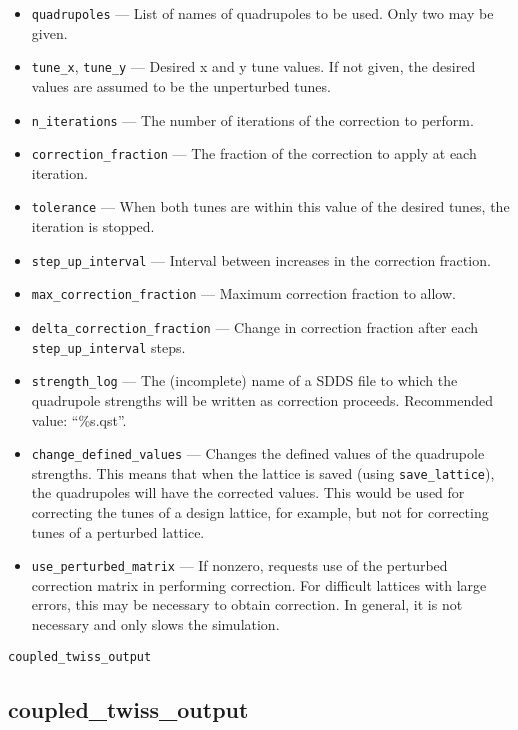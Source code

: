 \documentclass[11pt]{article}
\begin{document}
\begin{itemize}
\item \verb|quadrupoles| --- List of names of quadrupoles to be used.  Only two may be given.
\item \verb|tune_x|, \verb|tune_y| --- Desired x and y tune values.  If not given, the desired values are
assumed to be the unperturbed tunes.
\item \verb|n_iterations| --- The number of iterations of the correction to perform.
\item \verb|correction_fraction| --- The fraction of the correction to apply at each iteration.
\item \verb|tolerance| --- When both tunes are within this value of the desired tunes, the
iteration is stopped.
\item \verb|step_up_interval| --- Interval between increases in the correction fraction.
\item \verb|max_correction_fraction| --- Maximum correction fraction to allow.
\item \verb|delta_correction_fraction| --- Change in correction fraction after 
each \verb|step_up_interval| steps.
\item \verb|strength_log| --- The (incomplete) name of a SDDS file to which the quadrupole 
strengths will be written as correction proceeds.  Recommended value: ``\%s.qst''.
\item \verb|change_defined_values| --- Changes the defined values of the quadrupole strengths.
This means that when the lattice is saved (using \verb|save_lattice|), the quadrupoles will
have the corrected values.  This would be used for correcting the tunes of a design
lattice, for example, but not for correcting tunes of a perturbed lattice.
\item \verb|use_perturbed_matrix| --- If nonzero, requests use of the perturbed correction matrix in
performing correction.  For difficult lattices with large errors, this may be necessary
to obtain correction.  In general, it is not necessary and only slows the simulation.
\end{itemize}

\begin{latexonly}
\newpage
\begin{center}{\Large\verb|coupled_twiss_output|}\end{center}
\end{latexonly}
\subsection{coupled\_twiss\_output \label{subsec:coupledtwissoutput}}
\end{document}
